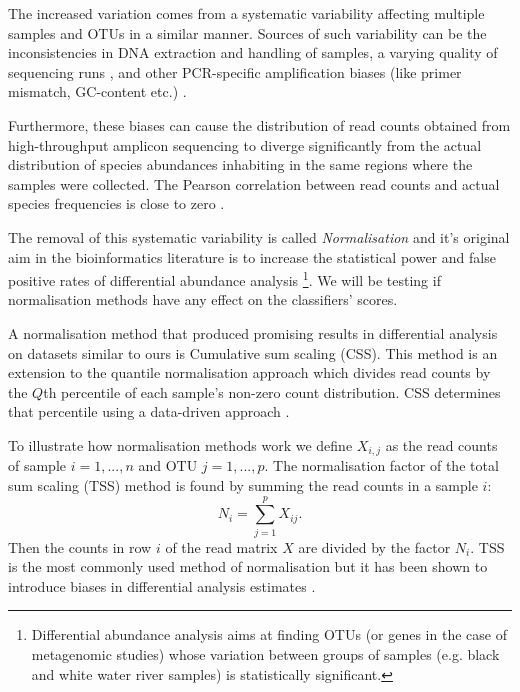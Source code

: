  The increased variation comes from a systematic variability affecting multiple samples and OTUs in a similar manner. Sources of such variability can be the inconsistencies in DNA extraction and handling of samples,  a varying quality of sequencing runs \cite{pereira_comparison_2018}, and other PCR-specific amplification biases (like primer mismatch, GC-content etc.) \cite{abundance_nodate,krehenwinkel_estimating_2017}.
 
 Furthermore, these biases can cause the distribution of read counts obtained from high-throughput amplicon sequencing to diverge significantly from the actual distribution of species abundances inhabiting in the same regions where the samples were collected. The Pearson correlation between read counts and actual species frequencies is close to zero \cite{edgar_unbias:_2017}.
 
 The removal of this systematic variability is called \textit{Normalisation} and it's original aim in the bioinformatics literature is to increase the statistical power and false positive rates of differential abundance analysis \footnote{Differential abundance analysis aims at finding OTUs (or genes in the case of metagenomic studies) whose variation between groups of samples (e.g. black and white water river samples) is statistically significant.}. We will be testing if normalisation methods have any effect on the classifiers' scores.
 
 A normalisation method that produced promising results in differential analysis on datasets similar to ours is Cumulative sum scaling (CSS). This method is an extension to the quantile normalisation approach which divides read counts by the $Q$th percentile of each sample’s non-zero count distribution. CSS determines that percentile using a data-driven approach \cite{css_diff_abund}.
 
 To illustrate how normalisation methods work we define $X_{i,j}$ as the read counts of sample  $i =1,...,n$ and OTU $j=1,...,p$. The normalisation factor of the total sum scaling (TSS) method is found by summing the read counts in a sample $i$:
 \begin{equation}
 	N_i = \sum_{j=1}^{p} X_{ij}.
 	\label{eq:totalsum}
 \end{equation}
Then the counts in row $i$ of the read matrix $X$ are divided by the factor $N_i$. TSS is the most commonly used method of normalisation but it has been shown to introduce biases in differential analysis estimates \cite{bullard_evaluation_2010}.

